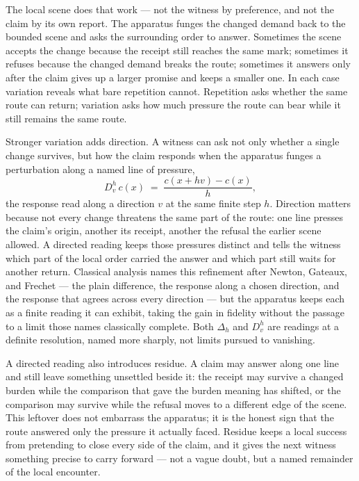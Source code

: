 The local scene does that work --- not the witness by preference, and not the claim by its own report. The apparatus funges the changed demand back to the bounded scene and asks the surrounding order to answer. Sometimes the scene accepts the change because the receipt still reaches the same mark; sometimes it refuses because the changed demand breaks the route; sometimes it answers only after the claim gives up a larger promise and keeps a smaller one. In each case variation reveals what bare repetition cannot. Repetition asks whether the same route can return; variation asks how much pressure the route can bear while it still remains the same route.

Stronger variation adds direction. A witness can ask not only whether a single change survives, but how the claim responds when the apparatus funges a perturbation along a named line of pressure,
\[ D^{h}_{v}\, c(x) \;=\; \frac{c(x + h v) - c(x)}{h}, \]
the response read along a direction $v$ at the same finite step $h$. Direction matters because not every change threatens the same part of the route: one line presses the claim's origin, another its receipt, another the refusal the earlier scene allowed. A directed reading keeps those pressures distinct and tells the witness which part of the local order carried the answer and which part still waits for another return. Classical analysis names this refinement after Newton, Gateaux, and Frechet --- the plain difference, the response along a chosen direction, and the response that agrees across every direction --- but the apparatus keeps each as a finite reading it can exhibit, taking the gain in fidelity without the passage to a limit those names classically complete. Both $\Delta_h$ and $D^h_v$ are readings at a definite resolution, named more sharply, not limits pursued to vanishing.

A directed reading also introduces residue. A claim may answer along one line and still leave something unsettled beside it: the receipt may survive a changed burden while the comparison that gave the burden meaning has shifted, or the comparison may survive while the refusal moves to a different edge of the scene. This leftover does not embarrass the apparatus; it is the honest sign that the route answered only the pressure it actually faced. Residue keeps a local success from pretending to close every side of the claim, and it gives the next witness something precise to carry forward --- not a vague doubt, but a named remainder of the local encounter.

